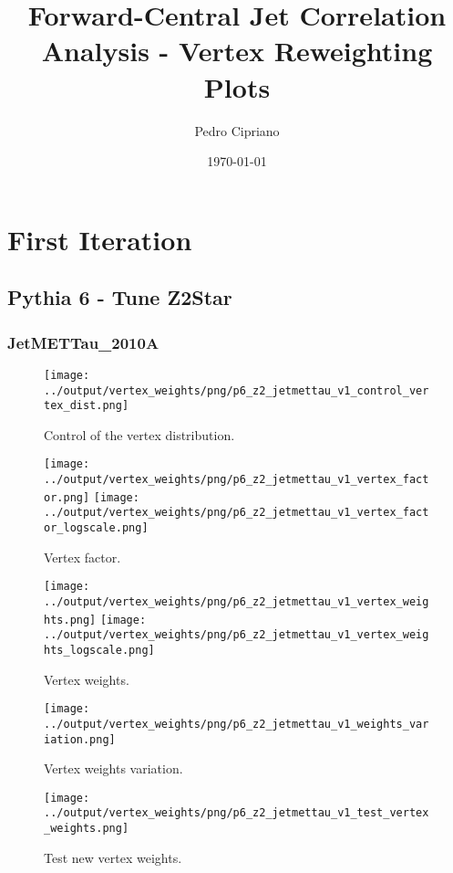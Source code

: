 \documentclass[11pt]{book}
\begin{document}
         
 
 \author{Pedro Cipriano}
 \date{\today}
 \title{Forward-Central Jet Correlation Analysis - Vertex Reweighting Plots}

\maketitle

\tableofcontents

\chapter{First Iteration}
\section{Pythia 6 - Tune Z2Star}
\subsection{JetMETTau\_2010A}
\begin{figure}[ht]
\centering
\texttt{[image: ../output/vertex\_weights/png/p6\_z2\_jetmettau\_v1\_control\_vertex\_dist.png]}
\caption{Control of the vertex distribution.}
\end{figure}

\begin{figure}[ht]
\centering
\texttt{[image: ../output/vertex\_weights/png/p6\_z2\_jetmettau\_v1\_vertex\_factor.png]}
\texttt{[image: ../output/vertex\_weights/png/p6\_z2\_jetmettau\_v1\_vertex\_factor\_logscale.png]}
\caption{Vertex factor.}
\end{figure}

\begin{figure}[ht]
\centering
\texttt{[image: ../output/vertex\_weights/png/p6\_z2\_jetmettau\_v1\_vertex\_weights.png]}
\texttt{[image: ../output/vertex\_weights/png/p6\_z2\_jetmettau\_v1\_vertex\_weights\_logscale.png]}
\caption{Vertex weights.}
\end{figure}

\begin{figure}[ht]
\centering
\texttt{[image: ../output/vertex\_weights/png/p6\_z2\_jetmettau\_v1\_weights\_variation.png]}
\caption{Vertex weights variation.}
\end{figure}

\begin{figure}[ht]
\centering
\texttt{[image: ../output/vertex\_weights/png/p6\_z2\_jetmettau\_v1\_test\_vertex\_weights.png]}
\caption{Test new vertex weights.}
\end{figure}
\clearpage
\end{document}
